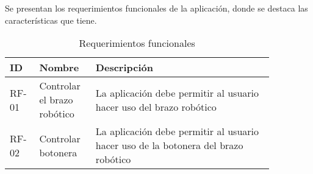 Se presentan los requerimientos funcionales de la aplicación, donde se destaca las características que tiene.

\begin{table}[h!]
\centering
\begin{tabular}{ | m{0.09\linewidth} | m{0.17\linewidth} | m{0.6\linewidth} | }
    \hline
    ID & Nombre & Descripción \\
    \hline
    RF-01 & Controlar el brazo robótico & La aplicación debe permitir al usuario hacer uso del brazo robótico \\
    \hline
    RF-02 & Controlar botonera & La aplicación debe permitir al usuario hacer uso de la botonera del brazo robótico \\
    \hline
\end{tabular}
\caption{Requerimientos funcionales}
\end{table}